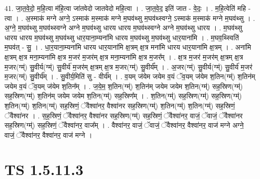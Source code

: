 \documentclass[17pt]{extarticle}
\begin{document}
41. जा॒त॒वे॒दो॒ म॒हि॒त्वा म॑हि॒त्वा जा॑तवेदो जातवेदो महि॒त्वा । . जा॒त॒वे॒द॒ इति॑ जात - वे॒दः॒ । . म॒हि॒त्वेति॑ महि - त्वा । . अ॒स्माक॑ मग्ने अग्ने॒ ऽस्माक॑ म॒स्माक॑ मग्ने म॒घव॑थ्सु म॒घव॑थ्स्वग्ने॒ ऽस्माक॑ म॒स्माक॑ मग्ने म॒घव॑थ्सु । . अ॒ग्ने॒ म॒घव॑थ्सु म॒घव॑थ्स्वग्ने अग्ने म॒घव॑थ्सु धारय धारय म॒घव॑थ्स्वग्ने अग्ने म॒घव॑थ्सु धारय । . म॒घव॑थ्सु धारय धारय म॒घव॑थ्सु म॒घव॑थ्सु धार॒याना॒म्यना॑मि धारय म॒घव॑थ्सु म॒घव॑थ्सु धार॒याना॑मि । . म॒घव॒थ्स्विति॑ म॒घव॑त् - सु॒ । . धा॒र॒याना॒म्यना॑मि धारय धार॒याना॑मि क्ष॒त्रम् क्ष॒त्र मना॑मि धारय धार॒याना॑मि क्ष॒त्रम् । . अना॑मि क्ष॒त्रम् क्ष॒त्र मना॒म्यना॑मि क्ष॒त्र म॒जर॑ म॒जर॑म् क्ष॒त्र मना॒म्यना॑मि क्ष॒त्र म॒जर᳚म् । . क्ष॒त्र म॒जर॑ म॒जर॑म् क्ष॒त्रम् क्ष॒त्र म॒जर(ग्म्॑) सु॒वीर्य(ग्म्॑) सु॒वीर्य॑ म॒जर॑म् क्ष॒त्रम् क्ष॒त्र म॒जर(ग्म्॑) सु॒वीर्य᳚म् । . अ॒जर(ग्म्॑) सु॒वीर्य(ग्म्॑) सु॒वीर्य॑ म॒जर॑ म॒जर(ग्म्॑) सु॒वीर्य᳚म् । . सु॒वीर्य॒मिति॑ सु - वीर्य᳚म् । . व॒यम् ज॑येम जयेम व॒यं ॅव॒यम् ज॑येम श॒तिन(ग्म्॑) श॒तिन॑म् जयेम व॒यं ॅव॒यम् ज॑येम श॒तिन᳚म् । . ज॒ये॒म॒ श॒तिन(ग्म्॑) श॒तिन॑म् जयेम जयेम श॒तिन(ग्म्॑) सह॒स्रिण(ग्म्॑) सह॒स्रिण(ग्म्॑) श॒तिन॑म् जयेम जयेम श॒तिन(ग्म्॑) सह॒स्रिण᳚म् । . श॒तिन(ग्म्॑) सह॒स्रिण(ग्म्॑) सह॒स्रिण(ग्म्॑) श॒तिन(ग्म्॑) श॒तिन(ग्म्॑) सह॒स्रिणं॒ ॅवैश्वा॑नर॒ वैश्वा॑नर सह॒स्रिण(ग्म्॑) श॒तिन(ग्म्॑) श॒तिन(ग्म्॑) सह॒स्रिणं॒ ॅवैश्वा॑नर । . स॒ह॒स्रिणं॒ ॅवैश्वा॑नर॒ वैश्वा॑नर सह॒स्रिण(ग्म्॑) सह॒स्रिणं॒ ॅवैश्वा॑नर॒ वाजं॒ ॅवाजं॒ ॅवैश्वा॑नर सह॒स्रिण(ग्म्॑) सह॒स्रिणं॒ ॅवैश्वा॑नर॒ वाज᳚म् । . वैश्वा॑नर॒ वाजं॒ ॅवाजं॒ ॅवैश्वा॑नर॒ वैश्वा॑नर॒ वाज॑ मग्ने अग्ने॒ वाजं॒ ॅवैश्वा॑नर॒ वैश्वा॑नर॒ वाज॑ मग्ने । \newline
\pagebreak
{}
\section*{ TS 1.5.11.3 }
\end{document}
